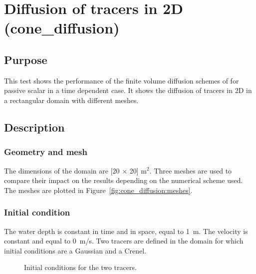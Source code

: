 \chapter{Diffusion of tracers in 2D (cone\_diffusion)}

\section{Purpose}
This test shows the performance of the finite volume diffusion schemes of
 for passive scalar in a time dependent case.
It shows the diffusion of tracers in 2D in a rectangular domain with different
meshes.

\section{Description}

\subsection{Geometry and mesh}

The dimensions of the domain are [20 $\times$ 20] m$^2$.
Three meshes are used to compare their impact on the results depending 
on the numerical scheme used. The meshes are plotted in
Figure~\ref{fig:cone_diffusion:meshes}.

\subsection{Initial condition}

The water depth is constant in time and in space, equal to 1~m. The velocity is
constant and equal to 0~m/s.
Two tracers are defined in the domain for which initial conditions are
a Gaussian and a Crenel.

\begin{figure}[h!]
\centering
{}
\caption{Initial conditions for the two tracers.}
\label{t2d:cone_diffusion:initial_conditions}
\end{figure}

